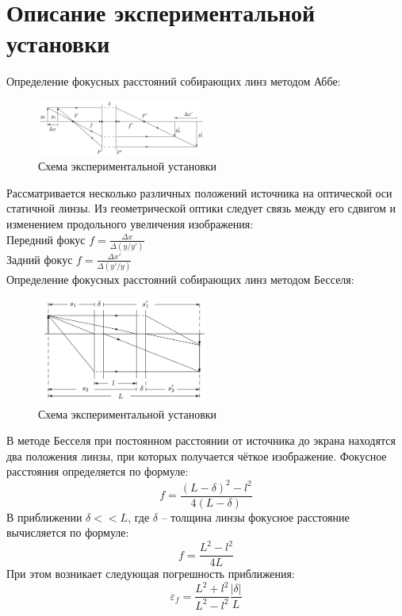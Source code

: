 \section*{Описание экспериментальной установки}

Определение фокусных расстояний собирающих линз методом Аббе:

\begin{figure}[H]
	\centering
	\includegraphics[width=0.5\textwidth]{../Изображения/Аббе.png}
	\caption{Схема экспериментальной установки}
\end{figure}

Рассматривается несколько различных положений источника на оптической оси статичной линзы. Из геометрической оптики следует связь между его сдвигом и изменением продольного увеличения изображения: \\
Передний фокус $f = \frac{\Delta x}{\Delta (y/y')}$ \\
Задний фокус $f = \frac{\Delta x'}{\Delta (y'/y)}$ \\

Определение фокусных расстояний собирающих линз методом Бесселя:

\begin{figure}[H]
	\centering
	\includegraphics[width=0.5\textwidth]{../Изображения/Бессель.png}
	\caption{Схема экспериментальной установки}
\end{figure}

В методе Бесселя при постоянном расстоянии от источника до экрана находятся два положения линзы, при которых получается чёткое изображение. Фокусное расстояния определяется по формуле:\\
$$f = \frac{(L - \delta)^2 - l^2}{4(L - \delta)}$$
В приближении $\delta << L$, где $\delta$ -- толщина линзы фокусное расстояние вычисляется по формуле: \\
$$f = \frac{L^{2} - l^{2}}{4L}$$
При этом возникает следующая погрешность приближения:
$$\varepsilon_f = \frac{L^2 + l^2}{L^2 - l^2} \frac{|\delta|}{L}$$

